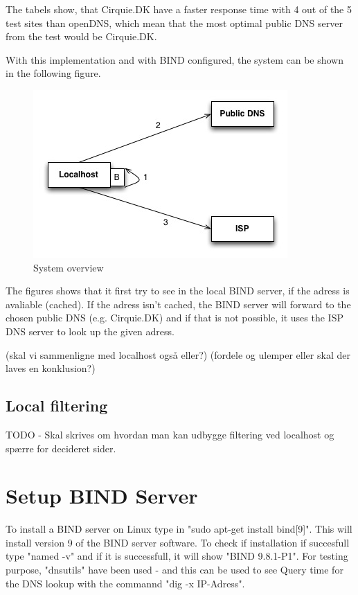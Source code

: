 \documentclass[Preamble]{subfiles}
\begin{document}
The tabels show, that Cirquie.DK have a faster response time with 4 out of the 5 test sites than openDNS, which mean that the most optimal public DNS server from the test would be Cirquie.DK. 

With this implementation and with BIND configured, the system can be shown in the following figure.

\begin{figure}[hbtp]
\centering
\includegraphics[scale=0.5]{../../Protoypes/DNS/ForwardingDiagram.jpg}
\caption{System overview}
\end{figure}


The figures shows that it first try to see in the local BIND server, if the adress is avaliable (cached). If the adress isn't cached, the BIND server will forward to the chosen public DNS (e.g. Cirquie.DK) and if that is not possible, it uses the ISP DNS server to look up the given adress. 

(skal vi sammenligne med localhost også eller?)
(fordele og ulemper eller skal der laves en konklusion?)


\subsection{Local filtering}
TODO - Skal skrives om hvordan man kan udbygge filtering ved localhost og spærre for decideret sider. 

\section{Setup BIND Server}
To install a BIND server on Linux type in "sudo apt-get install bind[9]". This will install version 9 of the BIND server software. To check if installation if succesfull type "named -v" and if it is successfull, it will show "BIND 9.8.1-P1". For testing purpose, "dnsutils" have been used - and this can be used to see Query time for the DNS lookup with the commannd "dig -x IP-Adress". 
\end{document}
